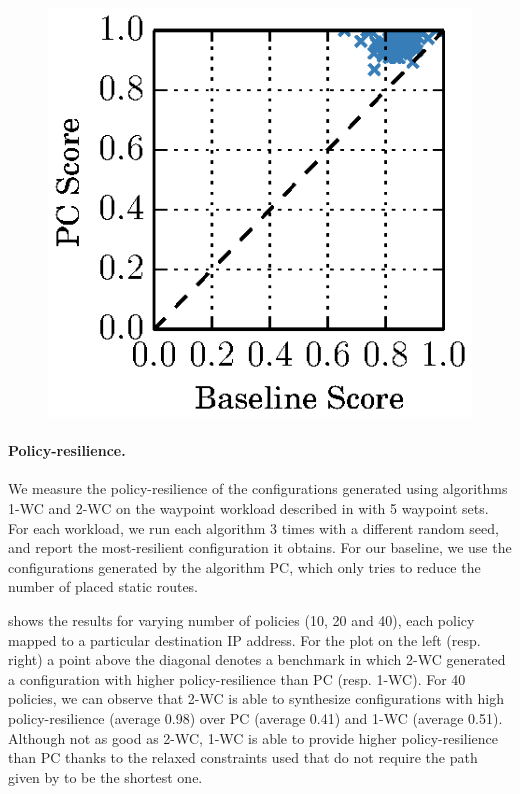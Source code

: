 \begin{figure}
	\begin{center}
		\includegraphics[width=0.20\columnwidth]{figures/ospfbaselineresilience.eps}
	\end{center} 
\end{figure}
\paragraph{Policy-resilience.}
We measure the policy-resilience of the configurations 
generated using algorithms  1-WC and 2-WC on the waypoint workload described in
 with 5 waypoint sets. 
For each workload, we run each algorithm 
3 times with a different random seed, and report the most-resilient configuration it obtains.
For our baseline, we use the configurations generated by the algorithm PC, which
only tries to reduce the number of placed static routes.

shows the results
for varying number of policies (10, 20 and 40), each policy mapped 
to a particular destination IP address. 
For the plot on the left (resp. right)
a point above the diagonal 
denotes a benchmark in which 2-WC
generated a configuration with higher policy-resilience than
PC (resp. 1-WC).
For 40 policies, 
we can observe that 2-WC is able to synthesize 
configurations with high policy-resilience
(average 0.98) over PC (average 0.41) and 1-WC (average 0.51). 
Although not as good as 2-WC, 1-WC is able to provide 
higher policy-resilience than
PC thanks to the relaxed constraints used that do not require
the path given by \genesis to be the shortest one.


